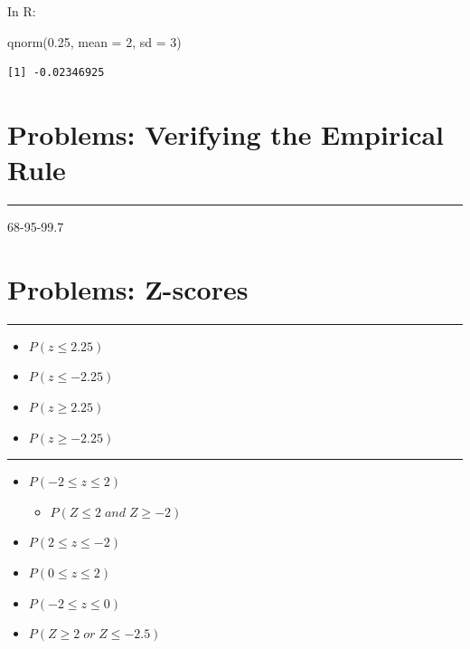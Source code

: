 \documentclass[
  letterpaper,
  DIV=11,
  numbers=noendperiod,
  oneside]{scrreprt}
\newenvironment{Shaded}{\begin{snugshade}}{\end{snugshade}}
\newcommand{\AttributeTok}[1]{\textcolor[rgb]{0.40,0.45,0.13}{#1}}
\newcommand{\DecValTok}[1]{\textcolor[rgb]{0.68,0.00,0.00}{#1}}
\newcommand{\FloatTok}[1]{\textcolor[rgb]{0.68,0.00,0.00}{#1}}
\newcommand{\FunctionTok}[1]{\textcolor[rgb]{0.28,0.35,0.67}{#1}}
\newcommand{\NormalTok}[1]{\textcolor[rgb]{0.00,0.23,0.31}{#1}}
\providecommand{\tightlist}{%
  \setlength{\itemsep}{0pt}\setlength{\parskip}{0pt}}\usepackage{longtable,booktabs,array}
\begin{document}
In R:

\begin{Shaded}
\begin{Highlighting}[]
\FunctionTok{qnorm}\NormalTok{(}\FloatTok{0.25}\NormalTok{, }\AttributeTok{mean =} \DecValTok{2}\NormalTok{, }\AttributeTok{sd =} \DecValTok{3}\NormalTok{)}
\end{Highlighting}
\end{Shaded}

\begin{verbatim}
[1] -0.02346925
\end{verbatim}

\hypertarget{problems-verifying-the-empirical-rule}{%
\section{Problems: Verifying the Empirical
Rule}\label{problems-verifying-the-empirical-rule}}

\begin{center}\rule{0.5\linewidth}{0.5pt}\end{center}

68-95-99.7

\hypertarget{problems-z-scores}{%
\section{Problems: Z-scores}\label{problems-z-scores}}

\begin{center}\rule{0.5\linewidth}{0.5pt}\end{center}

\begin{itemize}
\tightlist
\item
  \(P(z \le 2.25)\)
\item
  \(P(z \le -2.25)\)
\item
  \(P(z \ge 2.25)\)
\item
  \(P(z \ge -2.25)\)
\end{itemize}

\begin{center}\rule{0.5\linewidth}{0.5pt}\end{center}

\begin{itemize}
\tightlist
\item
  \(P(-2 \le z \le 2)\)

  \begin{itemize}
  \tightlist
  \item
    \(P(Z \le 2\; and\; Z \ge -2)\)
  \end{itemize}
\item
  \(P(2 \le z \le -2)\)
\item
  \(P(0 \le z \le 2)\)
\item
  \(P(-2 \le z \le 0)\)
\item
  \(P(Z \ge 2\; or\; Z \le -2.5)\)
\end{itemize}
\end{document}
